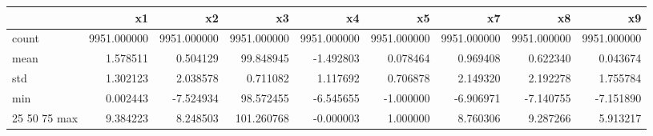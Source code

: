 \begin{tabular}{lrrrrrrrr}
\toprule
 & x1 & x2 & x3 & x4 & x5 & x7 & x8 & x9 \\
\midrule
count & 9951.000000 & 9951.000000 & 9951.000000 & 9951.000000 & 9951.000000 & 9951.000000 & 9951.000000 & 9951.000000 \\
mean & 1.578511 & 0.504129 & 99.848945 & -1.492803 & 0.078464 & 0.969408 & 0.622340 & 0.043674 \\
std & 1.302123 & 2.038578 & 0.711082 & 1.117692 & 0.706878 & 2.149320 & 2.192278 & 1.755784 \\
min & 0.002443 & -7.524934 & 98.572455 & -6.545655 & -1.000000 & -6.906971 & -7.140755 & -7.151890 \\
25%
50%
75%
max & 9.384223 & 8.248503 & 101.260768 & -0.000003 & 1.000000 & 8.760306 & 9.287266 & 5.913217 \\
\bottomrule
\end{tabular}
